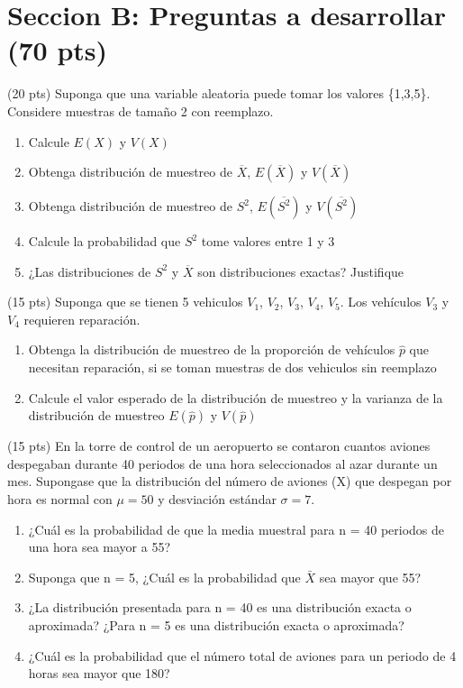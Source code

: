 \documentclass[addpoints]{exam}
\theoremstyle{mytheor}
\begin{document}
  \section*{Seccion B: Preguntas a desarrollar (70 pts)}
  
  
  \begin{questions} 
  \question (20 pts) Suponga que una variable aleatoria puede tomar los valores \{1,3,5\}. Considere muestras de tamaño 2 con reemplazo.
  
  \begin{enumerate}
  \item Calcule $E(X)$ y $V(X)$
  \item Obtenga distribución de muestreo de $\overline{X}$, $E(\overline{X})$ y $V(\overline{X})$
  \item Obtenga distribución de muestreo de $S^2$, $E(\overline{S^2})$ y $V(\overline{S^2})$
  \item Calcule la probabilidad que $S^2$ tome valores entre 1 y 3
  \item ¿Las distribuciones de $S^2$ y $\overline{X}$ son distribuciones exactas?
  Justifique
  \end{enumerate}
  
  \question (15 pts) Suponga que se tienen 5 vehiculos $V_1$, $V_2$, $V_3$, $V_4$, $V_5$. Los vehículos $V_3$ y $V_4$ requieren reparación.

  \begin{enumerate}
  \item Obtenga la distribución de muestreo de la proporción de vehículos $\hat{p}$ que necesitan reparación, si se toman muestras de dos vehiculos sin reemplazo
  \item Calcule el valor esperado de la distribución de muestreo y la varianza de la distribución de muestreo $E(\hat{p})$ y $V(\hat{p})$
  \end{enumerate}
  
  
  \question (15 pts) 
  En la torre de control de un aeropuerto se contaron cuantos aviones despegaban durante 40 periodos de una hora seleccionados al azar durante un mes. Supongase que la distribución del número de aviones (X) que despegan por hora es normal con $\mu = 50$ y desviación estándar $\sigma=7$.
  
  \begin{enumerate}
  \item ¿Cuál es la probabilidad de que la media muestral para n = 40 periodos de una hora sea mayor a 55?
  \item Suponga que n = 5, ¿Cuál es la probabilidad que $\bar{X}$ sea mayor que 55?
  \item ¿La distribución presentada para n = 40 es una distribución exacta o aproximada? ¿Para n = 5 es una distribución exacta o aproximada?
  \item ¿Cuál es la probabilidad que el número total de aviones para un periodo de 4 horas sea mayor que 180?
  \end{enumerate}
 

\end{questions}
\end{document}
